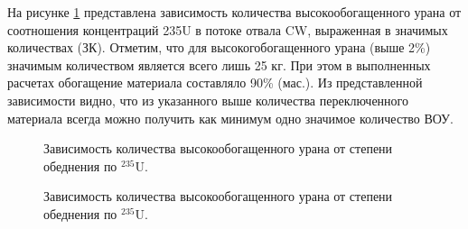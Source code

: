 На рисунке \ref{fig:np1} представлена зависимость количества высокообогащенного урана от соотношения концентраций 235U в потоке отвала CW, выраженная в значимых количествах (ЗК). Отметим, что для высокогобогащенного урана (выше 2\%) значимым количеством является всего лишь 25 кг. При этом в выполненных расчетах обогащение материала составляло 90\% (мас.).  Из представленной зависимости видно, что из указанного выше количества переключенного материала всегда можно получить как минимум одно значимое количество ВОУ.
\begin{figure}[ht]
  \caption{Зависимость количества высокообогащенного урана от степени обеднения по $^{235}$U.}\label{fig:np1}
\end{figure}

\begin{figure}[ht]
  \caption{Зависимость количества высокообогащенного урана от степени  обеднения по $^{235}$U.}\label{fig:np2}
\end{figure}

